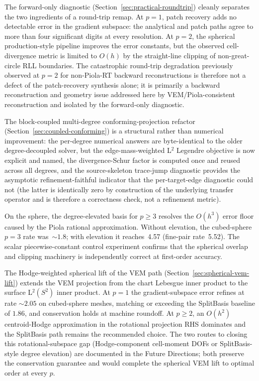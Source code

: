 \documentclass[11pt]{article}
\begin{document}
The forward-only diagnostic
(Section~\ref{sec:practical-roundtrip}) cleanly separates the two
ingredients of a round-trip remap.  At \(p=1\), patch recovery adds no
detectable error in the gradient subspace: the analytical and patch paths agree
to more than four significant digits at every resolution.  At \(p=2\), the
spherical production-style pipeline improves the error constants, but the
observed cell-divergence metric is limited to \(O(h)\) by the straight-line
clipping of non-great-circle RLL boundaries.  The catastrophic round-trip
degradation previously observed at \(p=2\) for non-Piola-RT backward
reconstructions is therefore not a defect of the patch-recovery synthesis alone;
it is primarily a backward reconstruction and geometry issue addressed here by
VEM/Piola-consistent reconstruction and isolated by the forward-only diagnostic.

The block-coupled multi-degree conforming-projection refactor
(Section~\ref{sec:coupled-conforming}) is a structural rather than
numerical improvement: the per-degree numerical answers are
byte-identical to the older degree-decoupled solver, but the
edge-mass-weighted L\(^2\) Legendre objective is now explicit and
named, the divergence-Schur factor is computed once and reused across
all degrees, and the source-skeleton trace-jump diagnostic provides
the asymptotic refinement-faithful indicator that the per-target-edge
diagnostic could not (the latter is identically zero by construction
of the underlying transfer operator and is therefore a correctness
check, not a refinement metric).

On the sphere, the degree-elevated basis for \(p\ge3\) resolves the
\(O(h^3)\) error floor caused by the Piola rational approximation.  Without
elevation, the cubed-sphere \(p=3\) rate was~\(\sim1.8\); with elevation it
reaches~4.57 (fine-pair rate~5.52).  The scalar piecewise-constant control
experiment confirms that the spherical overlap and clipping machinery is
independently correct at first-order accuracy.

The Hodge-weighted spherical lift of the VEM path
(Section~\ref{sec:spherical-vem-lift}) extends the VEM projection from
the chart Lebesgue inner product to the surface L\(^2(S^2)\) inner
product.  At \(p=1\) the gradient-subspace error refines at rate
\(\sim 2.05\) on cubed-sphere meshes, matching or exceeding the
SplitBasis baseline of \(1.86\), and conservation holds at machine
roundoff.  At \(p\ge2\), an \(O(h^2)\) centroid-Hodge approximation in
the rotational projection RHS dominates and the SplitBasis path
remains the recommended choice.  The two routes to closing this
rotational-subspace gap (Hodge-component cell-moment DOFs or
SplitBasis-style degree elevation) are documented in the Future
Directions; both preserve the conservation guarantee and would
complete the spherical VEM lift to optimal order at every \(p\).
\end{document}
